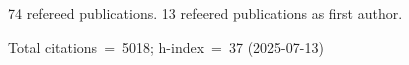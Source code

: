 74 refereed publications. 13 refeered publications as first author.

Total citations~=~5018; h-index~=~37 (2025-07-13)